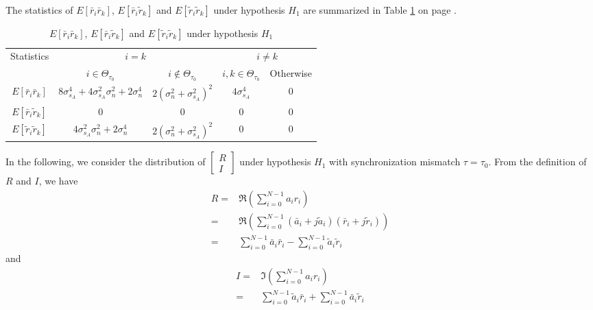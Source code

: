 The statistics of $E[\bar{r}_i\bar{r}_k]$, $E[\bar{r}_i\tilde{r}_k]$ and $E[\tilde{r}_i\tilde{r}_k]$ under hypothesis $H_1$ are summarized in Table \ref{Table3} on page \pageref{Table3}. 
\begin{table}[h]
\centering
\begin{tabular}{|c|c|c|c|c|}
\hline
\multirow{2}{*}{Statistics} & \multicolumn{2}{c|}{$i = k$}                                                              & \multicolumn{2}{c|}{$i \neq k$}        \\ \cline{2-5} 
                            & $i\in \Theta_{\tau_0}$                                 & $i \notin \Theta_{\tau_0}$       & $i, k \in \Theta_{\tau_0}$ & Otherwise  \\ \hline
$E[\bar{r}_i\bar{r}_k]$     & $8\sigma_{s_A}^4+4\sigma_{s_A}^2\sigma_n^2+2\sigma_n^4$ & $2(\sigma_n^2+\sigma_{s_A}^2)^2$ & $4\sigma_{s_A}^4$          & $0$       \\ \hline
$E[\bar{r}_i\tilde{r}_k]$   & $0$                                                    & $0$                              & $0$                        & $0$       \\ \hline
$E[\tilde{r}_i\tilde{r}_k]$ & $4\sigma_{s_A}^2\sigma_n^2+2\sigma_n^4$                & $2(\sigma_n^2+\sigma_{s_A}^2)^2$ & $0$                        & $0$       \\ \hline
\end{tabular}
\caption{$E[\bar{r}_i\bar{r}_k]$, $E[\bar{r}_i\tilde{r}_k]$ and $E[\tilde{r}_i\tilde{r}_k]$ under hypothesis $H_1$}
\label{Table3}
\end{table}

In the following, we consider the distribution of $\begin{bmatrix}
  R \\
  I
\end{bmatrix}$ under hypothesis $H_1$ with synchronization mismatch $\tau = \tau_0$.
From the definition of $R$ and $I$, we have 
\begin{equation}
  \begin{split}
	R = &\Re{(\sum_{i=0}^{N-1} a_ir_i)}\\
	= &\Re(\sum_{i=0}^{N-1}(\bar{a}_i+j\tilde{a}_i)(\bar{r}_i+j\tilde{r}_i))\\
	= &\sum_{i=0}^{N-1}\bar{a}_i\bar{r}_i - \sum_{i=0}^{N-1}\tilde{a}_i\tilde{r}_i
  \end{split}
  \label{R}
\end{equation}
and
\begin{equation}
  \begin{split}
	I = &\Im(\sum_{i=0}^{N-1} a_ir_i)\\
	= &\sum_{i=0}^{N-1}\tilde{a}_i\bar{r}_i + \sum_{i=0}^{N-1}\bar{a}_i\tilde{r}_i
  \end{split}
  \label{I}
\end{equation}


